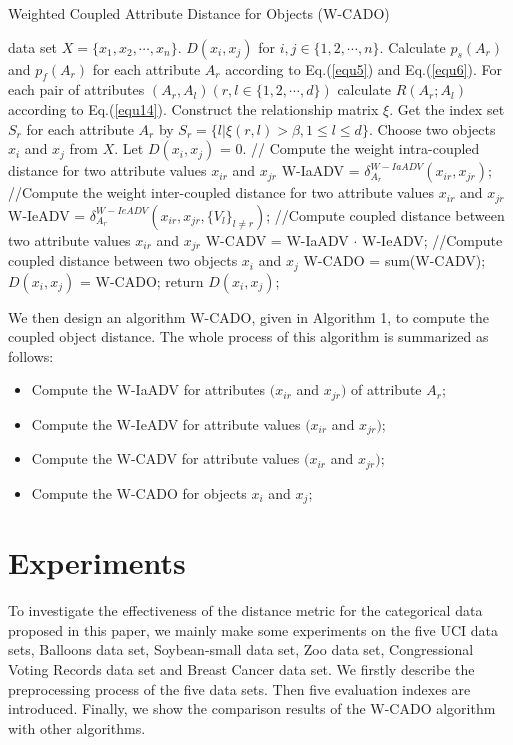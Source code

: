 \documentclass[review]{elsarticle}
\begin{document}
\begin{algorithm}[!ht]
  \caption{Weighted Coupled Attribute Distance for Objects (W-CADO)}
  \label{alg:Weight-CADO}
  \begin{algorithmic}[1]
    data set ${X = \{x_1,x_2,\cdots,x_n\}}$.
    ${D(x_i,x_j)}$ for ${i,j \in \{1,2,\cdots,n\}}$.
   \STATE Calculate ${p_s(A_r)}$ and ${p_f(A_r)}$ for each attribute ${A_r}$ according to Eq.(\ref{equ5}) and Eq.(\ref{equ6}).
   \STATE For each pair of attributes ${(A_r,A_l)(r,l \in \{1,2,\cdots,d\})}$ calculate ${R(A_r;A_l)}$ according to Eq.(\ref{equ14}).
   \STATE Construct the relationship matrix ${\xi}$.
   \STATE Get the index set ${S_r}$ for each attribute ${A_r}$ by ${S_r = \{l|\xi(r,l) > \beta, 1 \leq l \leq d\}}$.
   \STATE Choose two objects ${x_i}$ and ${x_j}$ from ${X}$.
   \STATE Let ${D(x_i,x_j)}$ = 0.
   \STATE // Compute the weight intra-coupled distance for two attribute values $x_{ir}$ and $x_{jr}$
   \STATE W-IaADV = $\delta_{A_r}^{W-IaADV}(x_{ir},x_{jr})$;
   \STATE //Compute the weight inter-coupled distance for two attribute values $x_{ir}$ and $x_{jr}$
   \STATE W-IeADV = $\delta_{A_r}^{W-IeADV}(x_{ir},x_{jr},\{V_l\}_{l \neq r})$;
   \STATE //Compute coupled distance between two attribute values $x_{ir}$ and $x_{jr}$
   \STATE W-CADV = W-IaADV $\cdot$ W-IeADV;
   \STATE //Compute coupled distance between two objects $x_{i}$ and $x_{j}$
   \STATE W-CADO = sum(W-CADV);
   \ENDFOR
   \ENDFOR
   \STATE ${D(x_i,x_j)}$ = W-CADO;
   \STATE return ${D(x_i,x_j)}$;
\end{algorithmic}
\end{algorithm}
We then design an algorithm W-CADO, given in Algorithm 1, to compute the coupled object distance. The whole process of this algorithm is summarized as follows:
\begin{itemize}
  \item Compute the W-IaADV for attributes $(x_{ir}$ and $x_{jr})$ of attribute $A_r$;
  \item Compute the W-IeADV for attribute values $(x_{ir}$ and $x_{jr})$;
  \item Compute the W-CADV for attribute values $(x_{ir}$ and $x_{jr})$;
  \item Compute the W-CADO for objects $x_{i}$ and $x_{j}$;
\end{itemize}

\section{Experiments}
To investigate the effectiveness of the distance metric for the categorical data proposed in this paper, we mainly make some experiments on the five UCI data sets, Balloons data set, Soybean-small data set, Zoo data set, Congressional Voting Records data set and Breast Cancer data set. We firstly describe the preprocessing process of the five data sets. Then five evaluation indexes are introduced. Finally, we show the comparison results of the W-CADO algorithm with other algorithms.
\end{document}
